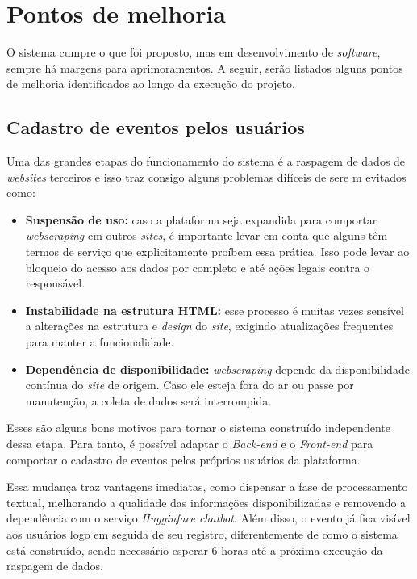 
\chapter{Pontos de melhoria}

O sistema cumpre o que foi proposto, mas em desenvolvimento de
\textit{software}, sempre há margens para aprimoramentos. A seguir, serão
listados alguns pontos de melhoria identificados ao longo da execução do
projeto.

\section{Cadastro de eventos pelos usuários}

Uma das grandes etapas do funcionamento do sistema é a raspagem de dados de
\textit{websites} terceiros e isso traz consigo alguns problemas difíceis de
sere
m evitados como:
\begin{itemize}
    \item \textbf{Suspensão de uso:} caso a plataforma seja expandida para comportar
          \textit{webscraping} em outros \textit{sites}, é importante levar em conta que
          alguns têm termos de serviço que explicitamente proíbem essa prática. Isso pode
          levar ao bloqueio do acesso aos dados por completo e até ações legais contra o
          responsável.

    \item \textbf{Instabilidade na estrutura HTML:} esse processo é muitas vezes sensível a alterações na estrutura e \textit{design} do \textit{site}, exigindo atualizações frequentes para manter a funcionalidade.

    \item \textbf{Dependência de disponibilidade:} \textit{webscraping} depende da disponibilidade contínua do \textit{site} de origem. Caso ele esteja fora do ar ou passe por manutenção, a coleta de dados será interrompida.
\end{itemize}

Esses são alguns bons motivos para tornar o sistema construído independente
dessa etapa. Para tanto, é possível adaptar o \textit{Back-end} e o
\textit{Front-end} para comportar o cadastro de eventos pelos próprios usuários
da plataforma.

Essa mudança traz vantagens imediatas, como dispensar a fase de processamento
textual, melhorando a qualidade das informações disponibilizadas e removendo a
dependência com o serviço \textit{Hugginface chatbot}. Além disso, o evento já
fica visível aos usuários logo em seguida de seu registro, diferentemente de
como o sistema está construído, sendo necessário esperar 6 horas até a próxima
execução da raspagem de dados.

